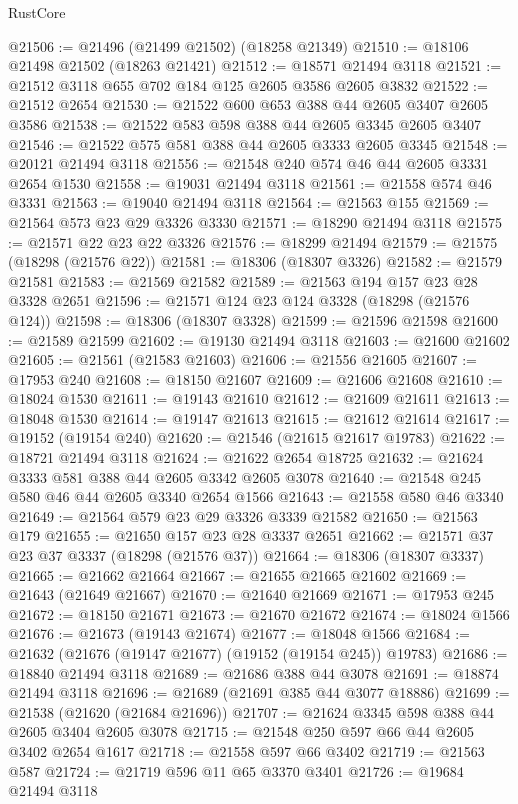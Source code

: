 \begin{lexlean}{RustCore}
\begin{coremodule}
@21506 := @21496 (@21499 @21502) (@18258 @21349)
@21510 := @18106 @21498 @21502 (@18263 @21421)
@21512 := @18571 @21494 @3118
@21521 := @21512 @3118 @655 @702 @184 @125 @2605 @3586 @2605 @3832
@21522 := @21512 @2654
@21530 := @21522 @600 @653 @388 @44 @2605 @3407 @2605 @3586
@21538 := @21522 @583 @598 @388 @44 @2605 @3345 @2605 @3407
@21546 := @21522 @575 @581 @388 @44 @2605 @3333 @2605 @3345
@21548 := @20121 @21494 @3118
@21556 := @21548 @240 @574 @46 @44 @2605 @3331 @2654 @1530
@21558 := @19031 @21494 @3118
@21561 := @21558 @574 @46 @3331
@21563 := @19040 @21494 @3118
@21564 := @21563 @155
@21569 := @21564 @573 @23 @29 @3326 @3330
@21571 := @18290 @21494 @3118
@21575 := @21571 @22 @23 @22 @3326
@21576 := @18299 @21494
@21579 := @21575 (@18298 (@21576 @22))
@21581 := @18306 (@18307 @3326)
@21582 := @21579 @21581
@21583 := @21569 @21582
@21589 := @21563 @194 @157 @23 @28 @3328 @2651
@21596 := @21571 @124 @23 @124 @3328 (@18298 (@21576 @124))
@21598 := @18306 (@18307 @3328)
@21599 := @21596 @21598
@21600 := @21589 @21599
@21602 := @19130 @21494 @3118
@21603 := @21600 @21602
@21605 := @21561 (@21583 @21603)
@21606 := @21556 @21605
@21607 := @17953 @240
@21608 := @18150 @21607
@21609 := @21606 @21608
@21610 := @18024 @1530
@21611 := @19143 @21610
@21612 := @21609 @21611
@21613 := @18048 @1530
@21614 := @19147 @21613
@21615 := @21612 @21614
@21617 := @19152 (@19154 @240)
@21620 := @21546 (@21615 @21617 @19783)
@21622 := @18721 @21494 @3118
@21624 := @21622 @2654 @18725
@21632 := @21624 @3333 @581 @388 @44 @2605 @3342 @2605 @3078
@21640 := @21548 @245 @580 @46 @44 @2605 @3340 @2654 @1566
@21643 := @21558 @580 @46 @3340
@21649 := @21564 @579 @23 @29 @3326 @3339 @21582
@21650 := @21563 @179
@21655 := @21650 @157 @23 @28 @3337 @2651
@21662 := @21571 @37 @23 @37 @3337 (@18298 (@21576 @37))
@21664 := @18306 (@18307 @3337)
@21665 := @21662 @21664
@21667 := @21655 @21665 @21602
@21669 := @21643 (@21649 @21667)
@21670 := @21640 @21669
@21671 := @17953 @245
@21672 := @18150 @21671
@21673 := @21670 @21672
@21674 := @18024 @1566
@21676 := @21673 (@19143 @21674)
@21677 := @18048 @1566
@21684 := @21632 (@21676 (@19147 @21677) (@19152 (@19154 @245)) @19783)
@21686 := @18840 @21494 @3118
@21689 := @21686 @388 @44 @3078
@21691 := @18874 @21494 @3118
@21696 := @21689 (@21691 @385 @44 @3077 @18886)
@21699 := @21538 (@21620 (@21684 @21696))
@21707 := @21624 @3345 @598 @388 @44 @2605 @3404 @2605 @3078
@21715 := @21548 @250 @597 @66 @44 @2605 @3402 @2654 @1617
@21718 := @21558 @597 @66 @3402
@21719 := @21563 @587
@21724 := @21719 @596 @11 @65 @3370 @3401
@21726 := @19684 @21494 @3118

\end{coremodule}
\end{lexlean}
